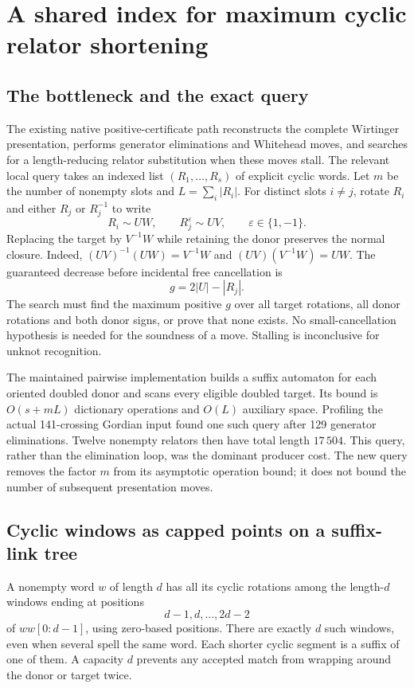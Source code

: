 \section{A shared index for maximum cyclic relator shortening}
\label{sec:joint-cyclic-overlap}

\subsection{The bottleneck and the exact query}

The existing native positive-certificate path reconstructs the complete
Wirtinger presentation, performs generator eliminations and Whitehead moves,
and searches for a length-reducing relator substitution when these moves
stall.  The relevant local query takes an indexed list
$(R_1,\ldots,R_s)$ of explicit cyclic words.  Let $m$ be the number of
nonempty slots and $L=\sum_i |R_i|$.  For distinct slots $i\ne j$, rotate
$R_i$ and either $R_j$ or $R_j^{-1}$ to write
\[
 R_i\sim UW,\qquad R_j^{\varepsilon}\sim UV,
 \qquad \varepsilon\in\{1,-1\}.
\]
Replacing the target by $V^{-1}W$ while retaining the donor preserves the
normal closure.  Indeed, $(UV)^{-1}(UW)=V^{-1}W$ and
$(UV)(V^{-1}W)=UW$.  The guaranteed decrease before incidental free
cancellation is
\[
 g=2|U|-|R_j|.
\]
The search must find the maximum positive $g$ over all target rotations,
all donor rotations and both donor signs, or prove that none exists.
No small-cancellation hypothesis is needed for the soundness of a move.
Stalling is inconclusive for unknot recognition.

The maintained pairwise implementation builds a suffix automaton for each
oriented doubled donor and scans every eligible doubled target.  Its bound
is $O(s+mL)$ dictionary operations and $O(L)$ auxiliary space.  Profiling
the actual 141-crossing Gordian input found one such query after 129 generator
eliminations.  Twelve nonempty relators then have total length $17\,504$.
This query, rather than the elimination loop, was the dominant producer
cost.  The new query removes the factor $m$ from its asymptotic operation
bound; it does not bound the number of subsequent presentation moves.

\subsection{Cyclic windows as capped points on a suffix-link tree}

A nonempty word $w$ of length $d$ has all its cyclic rotations among the
length-$d$ windows ending at positions
\[
 d-1,d,\ldots,2d-2
\]
of $ww[0:d-1]$, using zero-based positions.  There are exactly $d$ such
windows, even when several spell the same word.  Each shorter cyclic
segment is a suffix of one of them.  A capacity $d$ prevents any accepted
match from wrapping around the donor or target twice.

